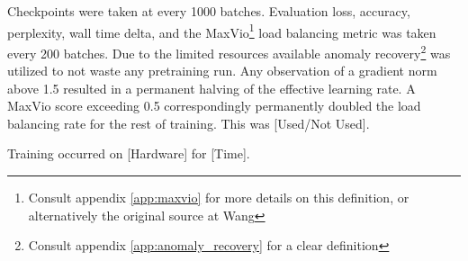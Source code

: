 \documentclass[11pt]{article}
\begin{document}
Checkpoints were taken at every 1000 batches. Evaluation loss, accuracy, perplexity, wall time delta, and the MaxVio\footnote{Consult appendix \ref{app:maxvio} for more details on this definition, or alternatively the original source at Wang\cite{wang2024auxiliarylossfree}} load balancing metric was taken every 200 batches. Due to the limited resources available anomaly recovery\footnote{Consult appendix \ref{app:anomaly_recovery} for a clear definition} was utilized to not waste any pretraining run. Any observation of a gradient norm above 1.5 resulted in a permanent halving of the effective learning rate. A MaxVio score exceeding 0.5 correspondingly permanently doubled the load balancing rate for the rest of training. This was [Used/Not Used].

Training occurred on [Hardware] for [Time].
\end{document}

